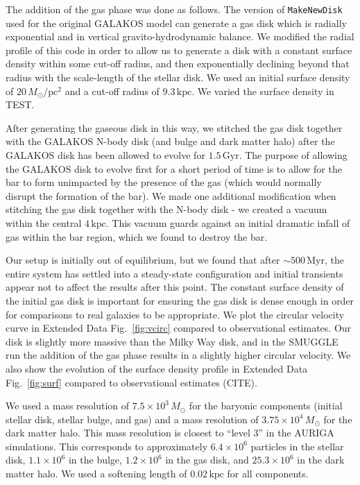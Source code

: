 \documentclass{natureprintstyle}
\begin{document}
The addition of the gas phase was done as follows. The version of
\texttt{MakeNewDisk} used for the original GALAKOS model can generate a gas
disk which is radially exponential and in vertical gravito-hydrodynamic
balance. We modified the radial profile of this code in order to allow us to
generate a disk with a constant surface density within some cut-off radius,
and then exponentially declining beyond that radius with the scale-length of
the stellar disk. We used an initial surface density of
$20\,M_{\odot}/\textrm{pc}^2$ and a cut-off radius of $9.3\,\textrm{kpc}$. We
varied the surface density in TEST.

After generating the gaseous disk in this way, we stitched the gas disk
together with the GALAKOS N-body disk (and bulge and dark matter halo) after
the GALAKOS disk has been allowed to evolve for $1.5\,\textrm{Gyr}$. The
purpose of allowing the GALAKOS disk to evolve first for a short period of
time is to allow for the bar to form unimpacted by the presence of the gas
(which would normally disrupt the formation of the bar). We made one
additional modification when stitching the gas disk together with the N-body
disk - we created a vacuum within the central $4\,\textrm{kpc}$. This vacuum
guards against an initial dramatic infall of gas within the bar region, which
we found to destroy the bar.

Our setup is initially out of equilibrium, but we found that after
$\sim500\,\textrm{Myr}$, the entire system has settled into a steady-state
configuration and initial transients appear not to affect the results after
this point. The constant surface density of the initial gas disk is important
for ensuring the gas disk is dense enough in order for comparisons to real
galaxies to be appropriate. We plot the circular velocity curve in Extended
Data Fig.~\ref{fig:vcirc} compared to observational
estimates.\cite{2019ApJ...871..120E} Our disk is slightly more massive than
the Milky Way disk, and in the SMUGGLE run the addition of the gas phase
results in a slightly higher circular velocity. We also show the evolution of
the surface density profile in Extended Data Fig.~\ref{fig:surf} compared to
observational estimates (CITE).

We used a mass resolution of $7.5\times10^3\,M_{\odot}$ for the baryonic
components (initial stellar disk, stellar bulge, and gas) and a mass
resolution of $3.75\times10^4\,M_{\odot}$ for the dark matter halo. This mass
resolution is closest to ``level 3'' in the AURIGA
simulations.\cite{2017MNRAS.467..179G} This corresponds to approximately
$6.4\times10^6$ particles in the stellar disk, $1.1\times10^6$ in the bulge,
$1.2\times10^6$ in the gas disk, and $25.3\times10^6$ in the dark matter halo.
We used a softening length of $0.02\,\textrm{kpc}$ for all components.
\end{document}
